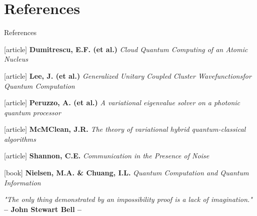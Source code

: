 \documentclass[9pt, handout, aspectratio=169]{beamer}		%
\begin{document}
\section{References}
	\begin{frame}{References}

		\begin{thebibliography}{9}

			 \textbf{Dumitrescu, E.F. (et al.)} \emph{Cloud Quantum Computing of an Atomic Nucleus}

			 \textbf{Lee, J. (et al.)} \emph{Generalized Unitary Coupled Cluster Wavefunctionsfor Quantum Computation}

			 \textbf{Peruzzo, A. (et al.)} \emph{A variational eigenvalue solver on a photonic quantum processor}

			 \textbf{McMClean, J.R.} \emph{The theory of variational hybrid quantum-classical algorithms}

			 \textbf{Shannon, C.E.} \emph{Communication in the Presence of Noise}

			[book]
			 \textbf{Nielsen, M.A. \& Chuang, I.L.} \emph{Quantum Computation and Quantum Information}

		\end{thebibliography}

		\vspace{20pt}
		\begin{small}
		\begin{center}{
		\color{gray}
			\emph{"The only thing demonstrated by an impossibility proof is a lack of imagination."} \\
			\textbf{– John Stewart Bell –} }
		\end{center}
		\end{small}
	\end{frame}

\FinalFrame
\end{document}
